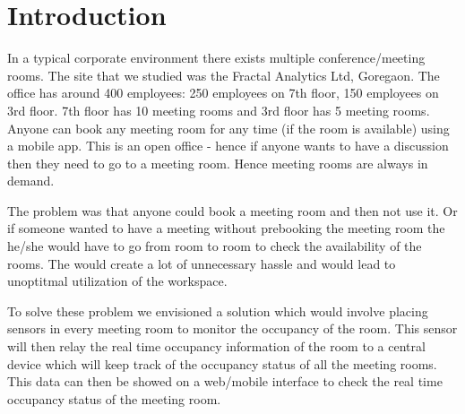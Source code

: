 \chapter{Introduction}

In a typical corporate environment there exists multiple conference/meeting rooms.
The site that we studied was the  Fractal Analytics Ltd, Goregaon. The office has around 400 employees: 250 employees on 7th floor, 150 employees on 3rd floor. 7th floor has 10 meeting rooms and 3rd floor has 5 meeting rooms. Anyone can book any meeting room for any time (if the room is available) using a mobile app. This is an open office - hence if anyone wants to have a discussion then they need to go to a meeting room. Hence meeting rooms are always in demand.

\vspace{20pt}

The problem was that anyone could book a meeting room and then not use it. Or if someone wanted to have a meeting without prebooking the meeting room the he/she would have to go from room to room to check the availability of the rooms. The would create a lot of unnecessary hassle and would lead to unoptitmal utilization of the workspace.

\vspace{20pt}

To solve these problem we envisioned a solution which would involve placing sensors in every meeting room to monitor the occupancy of the room. This sensor will then relay the real time occupancy information of the room to a central device which will keep track of the occupancy status of all the meeting rooms. This data can then be showed on a web/mobile interface to check the real time occupancy status of the meeting room.
